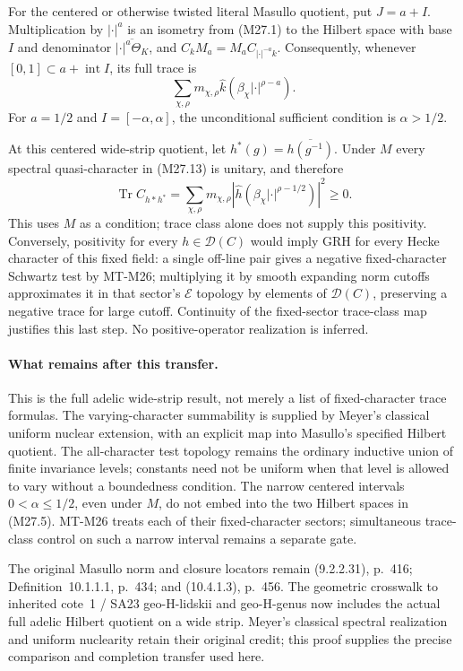 For the centered or otherwise twisted literal Masullo
quotient, put $J=a+I$. Multiplication by $|\cdot|^a$
is an isometry from (M27.1) to the Hilbert space with
base $I$ and denominator
$\overline{|\cdot|^a\Theta_K}$, and
$C_kM_a=M_aC_{|\cdot|^{-a}k}$.
Consequently, whenever $[0,1]\subset a+\operatorname{int}I$,
its full trace is
\[
       \sum_{\chi,\rho}m_{\chi,\rho}
                    \widehat k(\beta_\chi|\cdot|^{\rho-a}).
                                                               \tag{M27.13}
\]
For $a=1/2$ and $I=[-\alpha,\alpha]$, the unconditional
sufficient condition is $\alpha>1/2$.

At this centered wide-strip quotient, let
$h^*(g)=\overline{h(g^{-1})}$. Under $M$ every spectral
quasi-character in (M27.13) is unitary, and therefore
\[
       \operatorname{Tr}C_{h*h^*}
          =\sum_{\chi,\rho}m_{\chi,\rho}
               |\widehat h(\beta_\chi|\cdot|^{\rho-1/2})|^2\ge0.
                                                               \tag{M27.14}
\]
This uses $M$ as a condition; trace class alone does
not supply this positivity. Conversely, positivity
for every $h\in\mathcal D(C)$ would imply GRH for
every Hecke character of this fixed field: a single
off-line pair gives a negative fixed-character
Schwartz test by MT-M26; multiplying it by smooth
expanding norm cutoffs approximates it in that
sector's $\mathcal E$ topology by elements of
$\mathcal D(C)$, preserving a negative trace for
large cutoff. Continuity of the fixed-sector
trace-class map justifies this last step. No
positive-operator realization is inferred.

\paragraph{What remains after this transfer.}
This is the full adelic wide-strip result, not merely
a list of fixed-character trace formulas. The
varying-character summability is supplied by
Meyer's classical uniform nuclear extension, with
an explicit map into Masullo's specified Hilbert
quotient. The all-character test topology remains
the ordinary inductive union of finite invariance
levels; constants need not be uniform when that
level is allowed to vary without a boundedness
condition. The narrow centered intervals
$0<\alpha\le1/2$, even under $M$, do not embed
into the two Hilbert spaces in (M27.5).
MT-M26 treats each of their fixed-character
sectors; simultaneous trace-class control on
such a narrow interval remains a separate gate.

The original Masullo norm and closure locators
remain (9.2.2.31), p.~416; Definition~10.1.1.1,
p.~434; and (10.4.1.3), p.~456. The geometric
crosswalk to inherited cote~1 / SA23
geo-H-lidskii and geo-H-genus now includes the
actual full adelic Hilbert quotient on a wide
strip. Meyer's classical spectral realization
and uniform nuclearity retain their original
credit; this proof supplies the precise
comparison and completion transfer used here.
